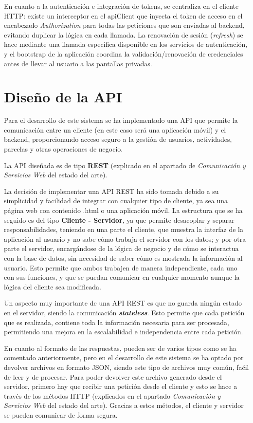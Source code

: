 En cuanto a la autenticación e integración de tokens, se centraliza en el cliente HTTP: existe un interceptor en el apiClient que inyecta el token de acceso en el encabezado \textit{Authorization} para todas las peticiones que son enviadas al backend, evitando duplicar la
lógica en cada llamada. La renovación de sesión (\textit{refresh}) se hace mediante una llamada específica disponible en los servicios de autenticación, y el bootstrap de la aplicación coordina la validación/renovación de credenciales antes de llevar al usuario a las pantallas privadas.

\section{Diseño de la API}

Para el desarrollo de este sistema se ha implementado una API que permite la comunicación entre un cliente (en este caso será una aplicación móvil) y el backend, proporcionando acceso seguro
a la gestión de usuarios, actividades, parcelas y otras operaciones de negocio.

La API diseñada es de tipo \textbf{REST} \cite{apiRest} (explicado en el apartado de \textit{Comunicación y Servicios Web} del estado del arte).

La decisión de implementar una API REST ha sido tomada debido a su simplicidad y facilidad de integrar con cualquier tipo de cliente, ya sea una página web con contenido .html o una 
aplicación móvil. La estructura que se ha seguido es del tipo \textbf{Cliente - Servidor}, ya que permite desacoplar y separar responsabilidades, teniendo en una parte el cliente, que muestra
la interfaz de la aplicación al usuario y no sabe cómo trabaja el servidor con los datos; y por otra parte el servidor, encargándose de la lógica de negocio y de cómo se interactua con 
la base de datos, sin necesidad de saber cómo es mostrada la información al usuario. Esto permite que ambos trabajen de manera independiente, cada uno con sus funciones, y que se puedan comunicar
en cualquier momento aunque la lógica del cliente sea modificada.

Un aspecto muy importante de una API REST es que no guarda ningún estado en el servidor, siendo la comunicación \textbf{\textit{stateless}}. Esto permite que cada petición que es realizada, 
contiene toda la información necesaria para ser procesada, permitiendo una mejora en la escalabilidad e independencia entre cada petición.

En cuanto al formato de las respuestas, pueden ser de varios tipos como se ha comentado anteriormente, pero en el desarrollo de este sistema se ha optado por devolver archivos en formato JSON, 
siendo este tipo de archivos muy común, faćil de leer y de procesar. Para poder devolver este archivo  generado desde el servidor, primero hay que recibir una petición desde el cliente y esto se
hace a través de los métodos HTTP (explicados en el apartado \textit{Comunicación y Servicios Web} del estado del arte). Gracias a estos métodos, el cliente y servidor se pueden comunicar de forma
segura.

